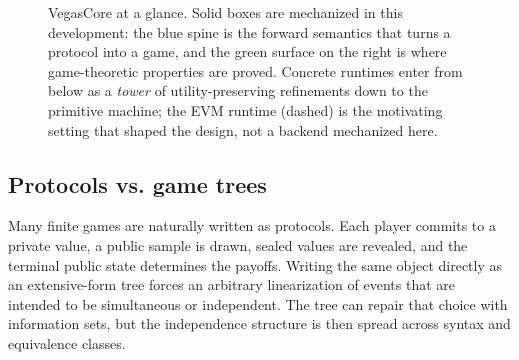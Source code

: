 \begin{figure}[t]
\caption{VegasCore at a glance.  Solid boxes are mechanized in this
development: the blue spine is the forward semantics that turns a protocol into
a game, and the green surface on the right is where game-theoretic properties
are proved.  Concrete runtimes enter from below as a \emph{tower} of
utility-preserving refinements down to the primitive machine; the EVM runtime
(dashed) is the motivating setting that shaped the design, not a backend
mechanized here.}
\label{fig:overview}
\end{figure}

\subsection{Protocols vs. game trees}

Many finite games are naturally written as protocols.  Each player
commits to a private value, a public sample is drawn, sealed values are
revealed, and the terminal public state determines the payoffs.  Writing
the same object directly as an
extensive-form tree forces an arbitrary linearization of events that are
intended to be simultaneous or independent.  The tree can repair that
choice with information sets, but the independence structure is then
spread across syntax and equivalence classes.

